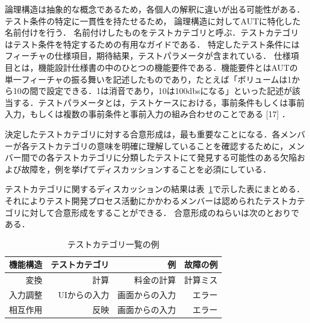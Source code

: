 \documentclass[a4paper,12pt]{jreport}
\begin{document}
 論理構造は抽象的な概念であるため，各個人の解釈に違いが出る可能性がある．テスト条件の特定に一貫性を持たせるため， 論理構造に対してAUTに特化した名前付けを行う．
名前付けしたものをテストカテゴリと呼ぶ．テストカテゴリはテスト条件を特定するための有用なガイドである．
特定したテスト条件にはフィーチャの仕様項目，期待結果，テストパラメータが含まれている．
仕様項目とは，機能設計仕様書の中のひとつの機能要件である．機能要件とはAUTの単一フィーチャの振る舞いを記述したものであり，たとえば「ボリュームは1から10の間で設定できる．1は消音であり，10は100dbsになる」といった記述が該当する．テストパラメータとは，テストケースにおける，事前条件もしくは事前入力，もしくは複数の事前条件と事前入力の組み合わせのことである [17] ．

      決定したテストカテゴリに対する合意形成は，最も重要なことになる．各メンバーが各テストカテゴリの意味を明確に理解していることを確認するために，メンバー間での各テストカテゴリに分類したテストにて発見する可能性のある欠陥および故障を，例を挙げてディスカッションすることを必須にしている．


テストカテゴリに関するディスカッションの結果は表~\ref{tbl:D-3-tbl1}で示した表にまとめる．それによりテスト開発プロセス活動にかかわるメンバーは認められたテストカテゴリに対して合意形成をすることができる． 合意形成のねらいは次のとおりである．

\begin{table}[t]
\caption{テストカテゴリ一覧の例}
\label{tbl:D-3-tbl1}
\begin{center}
\begin{tabular}{r|r|r|r}
機能構造&テストカテゴリ&例&故障の例\\
\hline
\hline
変換&計算&料金の計算&計算ミス\\
\hline
入力調整&UIからの入力&画面からの入力&エラー\\
\hline
相互作用&反映&画面からの入力&エラー\\
    \hline
\end{tabular}%
\end{center}
\end{table}
\end{document}
